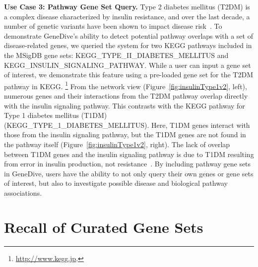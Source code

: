 \documentclass{ws-procs11x85}
\begin{document}
\noindent \textbf{Use Case 3: Pathway Gene Set Query.}  
Type 2 diabetes mellitus (T2DM) is a complex disease characterized by insulin resistance, and over the last decade, a number of genetic variants have been shown to impact disease risk~\cite{DeFronzo2015}. To demonstrate GeneDive's ability to detect potential pathway overlaps with a set of disease-related genes, we queried the system for two KEGG pathways included in the MSigDB gene sets: KEGG\_TYPE\_II\_DIABETES\_MELLITUS and KEGG\_INSULIN\_SIGNALING\_PATHWAY. While a user can input a gene set of interest, we demonstrate this feature using a pre-loaded gene set for the T2DM pathway in KEGG.%
\footnote{\url{http://www.kegg.jp}.}
From the network view (Figure~\ref{fig:insulinType1v2}, left), numerous genes and their interactions from the T2DM pathway overlap directly with the insulin signaling pathway. This contrasts with the KEGG pathway for Type 1 diabetes mellitus (T1DM) (KEGG\_TYPE\_1\_DIABETES\_MELLITUS). Here, T1DM genes interact with those from the insulin signaling pathway, but the T1DM genes are not found in the pathway itself (Figure~\ref{fig:insulinType1v2}, right). The lack of overlap between T1DM genes and the insulin signaling pathway is due to T1DM resulting from error in insulin production, not resistance~\cite{Katsarou2017}. By including pathway gene sets in GeneDive, users have the ability to not only query their own genes or gene sets of interest, but also to investigate possible disease and biological pathway associations.


\section{Recall of Curated Gene Sets} 
\label{sec:recall}
\end{document}
